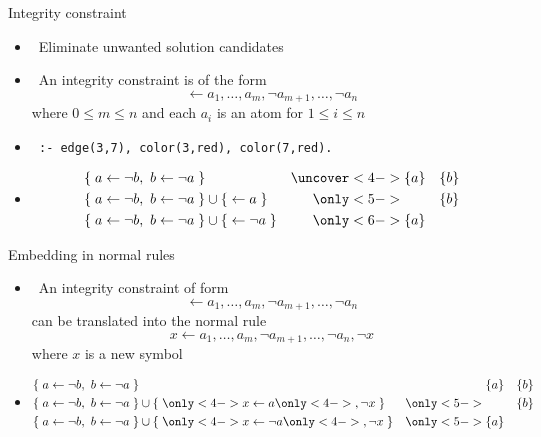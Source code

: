 \begin{frame}[fragile]{Integrity constraint}
  \begin{itemize}
  \item {}  \ Eliminate unwanted solution candidates
    \smallskip
  \item {}  \ An \alert{integrity constraint} is of the form
    \[
      \leftarrow a_1,\dots,a_m,\neg a_{m+1},\dots,\neg a_n
    \]
    where $0\leq m\leq n$ and each $a_i$ is an atom for $1\leq i\leq n$
    \medskip
  \item<only@2> 
\begin{lstlisting}
 :- edge(3,7), color(3,red), color(7,red).
\end{lstlisting}
  \item<only@3-> 
    \begin{align*}
      & \{\;
        a \leftarrow \neg b, \
        b \leftarrow \neg a
        \;\}&\uncover<4->{\{a\}\quad\{b\}}\\
      & \{\;
        a \leftarrow \neg b, \
        b \leftarrow \neg a
        \;\}
        \cup
        \{\;
        \leftarrow a
        \;\}&\only<5->{\phantom{\{a\}}\quad\{b\}}\\
      & \{\;
        a \leftarrow \neg b, \
        b \leftarrow \neg a
        \;\}
        \cup
        \{\;
        \leftarrow \neg a
        \;\}&\only<6->{\{a\}\quad\phantom{\{b\}}}
    \end{align*}
  \end{itemize}
\end{frame}
\begin{frame}{Embedding in normal rules}
  \begin{itemize}
  \item<2-> \structure{Translation} \ An integrity constraint of form
    \[
      \leftarrow a_1,\dots,a_m,\neg a_{m+1},\dots,\neg a_n
    \]
    can be translated into the normal rule
    \[
      x \leftarrow a_1,\dots,a_m,\neg a_{m+1},\dots,\neg a_n,\neg x
    \]
    where $x$ is a new symbol %
    \smallskip
  \item<3-> 
    \begin{align*}
      & \{\;
        a \leftarrow \neg b, \
        b \leftarrow \neg a
        \;\}&\{a\}\quad\{b\}\\
      & \{\;
        a \leftarrow \neg b, \
        b \leftarrow \neg a
        \;\}
        \cup
        \{\;
        \only<4->{x}\leftarrow a\only<4->{,\neg x}
        \;\}&\only<5->{\phantom{\{a\}}\quad\{b\}}\\
      & \{\;
        a \leftarrow \neg b, \
        b \leftarrow \neg a
        \;\}
        \cup
        \{\;
        \only<4->{x}\leftarrow \neg a\only<4->{,\neg x}
        \;\}&\only<5->{\{a\}\quad\phantom{\{b\}}}
    \end{align*}
  \end{itemize}
\end{frame}
%

